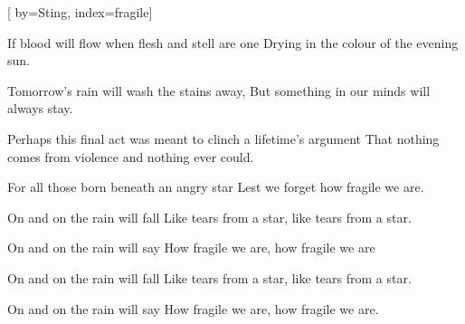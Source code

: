 
[%
    by={Sting},
    index={fragile}]


    \label{fragile}

    \beginverse
        If blood will flow when flesh and stell are one
        Drying in the colour of the evening sun.

        Tomorrow's rain will wash the stains away,
        But something in our minds will always stay.

        Perhaps this final act was meant to clinch a lifetime's argument
        That nothing comes from violence and nothing ever could.

        For all those born beneath an angry star
        Lest we forget how fragile we are.
    \endverse

    \beginchorus
        On and on the rain will fall
        Like tears from a star, like tears from a star.

        On and on the rain will say
        How fragile we are, how fragile we are
    \endchorus

    \beginverse*
    \endverse

    \beginchorus
        On and on the rain will fall
        Like tears from a star, like tears from a star.

        On and on the rain will say
        How fragile we are, how fragile we are. 
    \endchorus
\endsong
